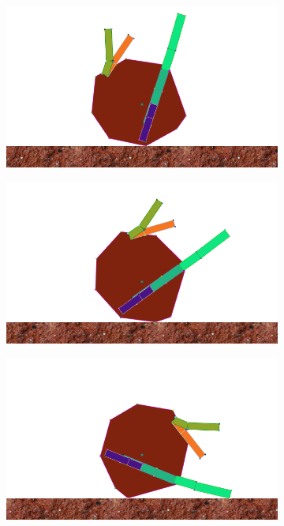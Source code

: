 \begin{figure}[H]
        \begin{subfigure}[b]{0.3\textwidth}
          \includegraphics[width=\linewidth,center]{graphics/simulation-discussion/roll_4}
          \caption{\label{fig:roll_4}}
        \end{subfigure}
        \hspace{\fill}
        \begin{subfigure}[b]{0.3\textwidth}
          \includegraphics[width=\linewidth,center]{graphics/simulation-discussion/roll_5}
          \caption{\label{fig:roll_5}}
        \end{subfigure}
        \hspace{\fill}
        \begin{subfigure}[b]{0.3\textwidth}
          \includegraphics[width=\linewidth,center]{graphics/simulation-discussion/roll_6}
          \caption{\label{fig:roll_6}}
        \end{subfigure}


\end{figure}
